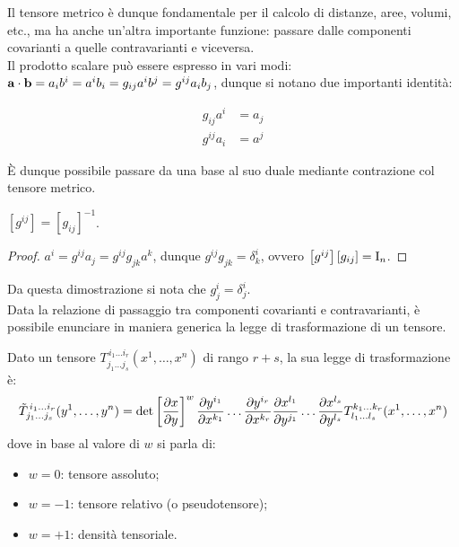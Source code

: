 Il tensore metrico è dunque fondamentale per il calcolo di distanze, aree, volumi, etc., ma ha anche un'altra importante funzione: passare dalle componenti covarianti a quelle contravarianti e viceversa.\\
Il prodotto scalare può essere espresso in vari modi: $ \mathbf{a}\cdot\mathbf{b} = a_i b^i = a^i b_i = g_{ij} a^i b^j = g^{ij} a_i b_j $, dunque si notano due importanti identità:

\begin{equation}
	\begin{split}
		g_{ij} a^i &= a_j \\
		g^{ij} a_i &= a^j
	\end{split}
	\label{eq:12}
\end{equation}

È dunque possibile passare da una base al suo duale mediante contrazione col tensore metrico.

\begin{proposition}
	$ \left[g^{ij}\right] = \left[g_{ij}\right]^{-1} $.
\end{proposition}
\begin{proof}
	$ a^i = g^{ij} a_j = g^{ij} g_{jk} a^k $, dunque $ g^{ij} g_{jk} = \delta^i_k $, ovvero $ \left[g^{ij}\right]\left[g_{ij}\right] = \mathbf{\text{I}}_n $.
\end{proof}

Da questa dimostrazione si nota che $ g^i_j = \delta^i_j $.\\
Data la relazione di passaggio tra componenti covarianti e contravarianti, è possibile enunciare in maniera generica la legge di trasformazione di un tensore.

\begin{definition}
	Dato un tensore $ T^{\,i_1 \dots i_r}_{j_1 \dots j_s} (x^1, \dots, x^n) $ di rango $ r+s $, la sua legge di trasformazione è:
	\begin{equation}
		\tilde{T}^{\,i_1 \dots i_r}_{j_1 \dots j_s} (y^1, \dots, y^n) = \det\left[\frac{\partial x}{\partial y}\right]^w \frac{\partial y^{i_1}}{\partial x^{k_1}} \dots \frac{\partial y^{i_r}}{\partial x^{k_r}} \frac{\partial x^{l_1}}{\partial y^{j_1}} \dots \frac{\partial x^{l_s}}{\partial y^{l_s}} T^{k_1 \dots k_r}_{l_1 \dots l_s} (x^1, \dots, x^n)
		\label{eq:13}
	\end{equation}
	dove in base al valore di $ w $ si parla di:
	\begin{itemize}
		\item $ w = 0 $: tensore assoluto;
		\item $ w = -1 $: tensore relativo (o pseudotensore);
		\item $ w = +1 $: densità tensoriale.
	\end{itemize}
\end{definition}

